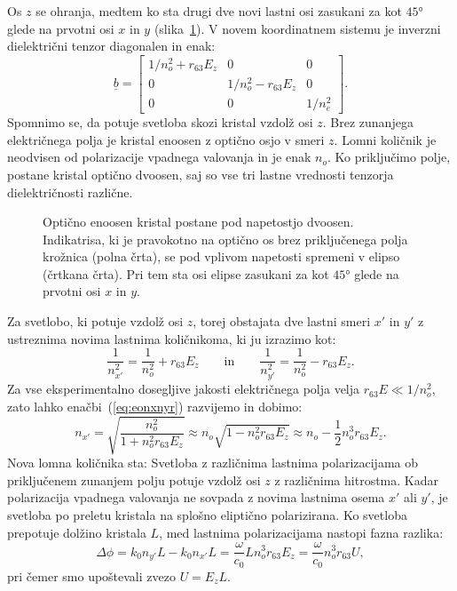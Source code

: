 Os $z$ se ohranja, medtem ko sta drugi dve novi lastni osi zasukani za kot $45\si{\degree}$ 
glede na prvotni osi $x$ in $y$ (slika~\ref{fig:amn}).
V novem koordinatnem sistemu je inverzni dielektrični tenzor diagonalen in enak:
\begin{equation}
\underline{b} = 
\left[\begin{array}{ccc}
1/n_o^2 + r_{63}E_z& 0& 0\\
0 & 1/n_o^2 - r_{63}E_z& 0\\
0 & 0& 1/n_e^2
\end{array}\right]\!\!.
\end{equation}
Spomnimo se, da potuje svetloba skozi kristal vzdolž osi $z$. Brez zunanjega električnega
polja je kristal enoosen z optično osjo v smeri $z$. 
Lomni količnik je neodvisen od
polarizacije vpadnega valovanja in je enak $n_o$. Ko priključimo polje, postane kristal
optično dvoosen, saj so vse tri lastne vrednosti tenzorja dielektričnosti različne. 
\begin{figure}[ht]
\centering
\def\svgwidth{60truemm} 

\caption{Optično enoosen kristal postane pod napetostjo dvoosen. Indikatrisa, ki je pravokotno
na optično os brez priključenega polja krožnica (polna črta), se pod vplivom 
napetosti spremeni v elipso (črtkana črta). Pri tem sta osi elipse zasukani za kot 
$45\si{\degree}$ glede na prvotni osi $x$ in $y$.}
\label{fig:amn}
\end{figure}

Za svetlobo, 
ki potuje vzdolž osi $z$, torej obstajata dve lastni smeri $x'$ in $y'$ z ustreznima
novima lastnima količnikoma, ki ju izrazimo kot:
\begin{equation}
\frac{1}{n_{x'}^2} = \frac{1}{n_o^2}+ r_{63}E_z \qquad \mathrm{in} \qquad 
\frac{1}{n_{y'}^2} = \frac{1}{n_o^2}- r_{63}E_z. 
\label{eq:eonxnyr}
\end{equation}
Za vse eksperimentalno dosegljive jakosti električnega polja velja $r_{63}E\ll1/n_o^2$,
zato lahko  
enačbi~(\ref{eq:eonxnyr}) razvijemo in dobimo:
\begin{equation}
n_{x'} = \sqrt{\frac{n_o^2}{1+ n_o^2 r_{63}E_z}} \approx n_o \sqrt{1- n_o^2 r_{63}E_z} \approx
n_o - \frac{1}{2}n_o^3 r_{63}E_z.
\end{equation}
Nova lomna količnika sta:
Svetloba z različnima lastnima polarizacijama ob priključenem zunanjem polju potuje vzdolž 
osi $z$ z različnima hitrostma. 
Kadar polarizacija vpadnega valovanja ne sovpada z novima lastnima osema $x'$ ali $y'$, je 
svetloba po preletu kristala na splošno eliptično polarizirana. Ko svetloba
prepotuje dolžino kristala $L$, med lastnima polarizacijama nastopi fazna razlika:
\begin{equation}
\Delta \phi = k_0 n_{y'} L - k_0 n_{x'} L = \frac{\omega}{c_0}L 
n_o^3 r_{63}E_z = \frac{\omega}{c_0} n_o^3 r_{63}U,
\label{phiAM}
\end{equation} 
pri čemer smo upoštevali zvezo $U = E_zL$. 

